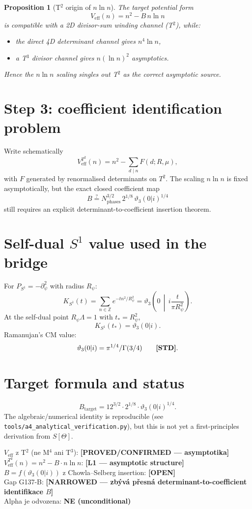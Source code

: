 \documentclass[12pt,a4paper]{article}
\newtheorem{proposition}{Proposition}[section]
\begin{document}
\begin{proposition}[T$^2$ origin of \(n\ln n\)]
The target potential form
\[
V_{\mathrm{eff}}(n)=n^2-B\,n\ln n
\]
is compatible with a 2D divisor-sum winding channel (T$^2$), while:
\begin{itemize}
  \item the direct 4D determinant channel gives \(n^4\ln n\),
  \item a T$^3$ divisor channel gives \(n(\ln n)^2\) asymptotics.
\end{itemize}
Hence the \(n\ln n\) scaling singles out T$^2$ as the correct asymptotic source.
\end{proposition}

\section{Step 3: coefficient identification problem}
Write schematically
\[
V_{\mathrm{eff}}^{T^2}(n)=n^2-\sum_{d\mid n}F(d;R,\mu),
\]
with \(F\) generated by renormalised determinants on \(T^2\).
The scaling \(n\ln n\) is fixed asymptotically, but the exact closed coefficient map
\[
B \stackrel{?}{=} N_{\mathrm{phases}}^{3/2}\,2^{1/8}\,\vartheta_3(0|i)^{1/4}
\]
still requires an explicit determinant-to-coefficient insertion theorem.

\section{Self-dual \(S^1\) value used in the bridge}
For $P_{S^1}=-\partial_\psi^2$ with radius $R_\psi$:
\[
K_{S^1}(t)=\sum_{n\in\mathbb Z}e^{-tn^2/R_\psi^2}
=\vartheta_3\!\left(0\,\middle|\,i\frac{t}{\pi R_\psi^2}\right).
\]
At the self-dual point $R_\psi\Lambda=1$ with $t_*=R_\psi^2$,
\[
K_{S^1}(t_*)=\vartheta_3(0|i).
\]
Ramanujan's CM value:
\[
\vartheta_3(0|i)=\pi^{1/4}/\Gamma(3/4)\qquad\text{\textbf{[STD]}}.
\]

\section{Target formula and status}
\[
B_{\mathrm{target}}
=12^{3/2}\cdot 2^{1/8}\cdot \vartheta_3(0|i)^{1/4}.
\]
The algebraic/numerical identity is reproducible (see
\texttt{tools/a4\_analytical\_verification.py}), but this is not yet a
first-principles derivation from $S[\Theta]$.

\begin{statusbox}[title={Gap G137-B — Analytický verdikt}]
$V_{\mathrm{eff}}$ z T$^2$ (ne M$^4$ ani T$^3$): \textbf{[PROVED/CONFIRMED — asymptotika]}\\
$V_{\mathrm{eff}}^{T^2}(n)=n^2-B\cdot n\ln n$: \textbf{[L1 — asymptotic structure]}\\
$B=f(\vartheta_3(0|i))$ z Chowla--Selberg insertion: \textbf{[OPEN]}\\
Gap G137-B: \textbf{[NARROWED — zbývá přesná determinant-to-coefficient identifikace $B$]}\\
Alpha je odvozena: \textbf{NE (unconditional)}
\end{statusbox}
\end{document}
